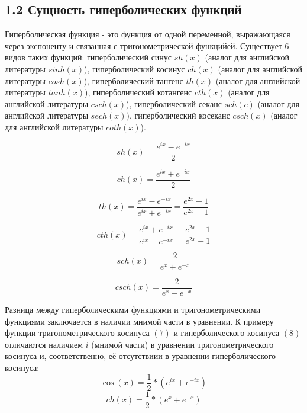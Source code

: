 \subsection*{1.2 Сущность гиперболических функций}
Гиперболическая функция - это функция от одной переменной, выражающаяся через экспоненту и связанная с тригонометрической функцийей. Существует 6 видов таких функций: 
гиперболический синус $sh(x)$ (аналог для английской литературы $sinh(x)$), гиперболический косинус $ch(x)$ (аналог для английской литературы $cosh(x)$), 
гиперболический тангенс $th(x)$ (аналог для английской литературы $tanh(x)$), гиперболический котангенс $cth(x)$ (аналог для английской литературы $csch(x)$), 
гиперболический секанс $sch(c)$ (аналог для английской литературы $sech(x)$), гиперболический косеканс $csch(x)$ (аналог для английской литературы $coth(x)$).

\begin{equation}
    sh(x)=\frac{e^{ix}-e^{-ix}}{2}
 \end{equation}
 
 \begin{equation}
    ch(x)=\frac{e^{ix}+e^{-ix}}{2}
 \end{equation}
 
 \begin{equation}
    th(x)=\frac{e^{ix}-e^{-ix}}{e^{ix}+e^{-ix}}=\frac{e^{2x}-1}{e^{2x}+1}
 \end{equation}
 
 \begin{equation}
    cth(x)=\frac{e^{ix}+e^{-ix}}{e^{ix}-e^{-ix}}=\frac{e^{2x}+1}{e^{2x}-1}
 \end{equation}
 
 \begin{equation}
    sch(x)=\frac{2}{e^{x}+e^{-x}}
 \end{equation}
 
 \begin{equation}
    csch(x)=\frac{2}{e^{x}-e^{-x}}
 \end{equation}
 
Разница между гиперболическими функциями и тригонометрическими функциями заключается в наличии мнимой части в уравнении. 
К примеру функции тригонометрического косинуса $(7)$ и гиперболического косинуса $(8)$ отличаются наличием $i$ (мнимой части) в уравнении тригонометрического косинуса и, соответственно, её отсутствиии в уравнении гиперболического косинуса:\\
 \begin{equation}
    \cos(x)=\frac{1}{2}*(e^{ix}+e^{-ix})
 \end{equation}
 \begin{equation}
    ch(x)=\frac{1}{2}*(e^{x}+e^{-x})
\end{equation}

